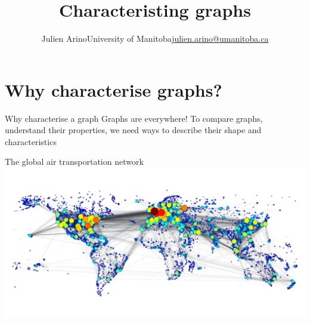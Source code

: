\documentclass[aspectratio=169]{beamer}\usepackage[]{graphicx}\usepackage[]{xcolor}
\title{Characteristing graphs}
\author{\texorpdfstring{Julien Arino\newline University of Manitoba\newline\url{julien.arino@umanitoba.ca}}{Julien Arino}}
\date{}
\begin{document}


\section{Why characterise graphs?}


\begin{frame}{Why characterise a graph}
Graphs are everywhere!
\vfill
To compare graphs, understand their properties, we need ways to describe their shape and characteristics
\end{frame}

\begin{frame}{The global air transportation network}
	\bigskip
	{\centering
		\hspace*{-\beamerleftmargin}
		\includegraphics[width=\paperwidth]{FIGS_slides/world_graph-degree}
	}
\end{frame}
\end{document}
